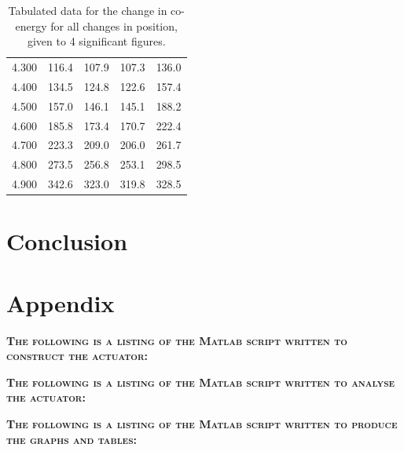 \documentclass[a4paper]{IEEEtran}
\begin{document}
\begin{table}[]
\begin{tabular}{c|cccc}
            4.300 & 116.4 & 107.9 & 107.3 & 136.0 \\
            4.400 & 134.5 & 124.8 & 122.6 & 157.4 \\
            4.500 & 157.0 & 146.1 & 145.1 & 188.2 \\
            4.600 & 185.8 & 173.4 & 170.7 & 222.4 \\
            4.700 & 223.3 & 209.0 & 206.0 & 261.7 \\
            4.800 & 273.5 & 256.8 & 253.1 & 298.5 \\
            4.900 & 342.6 & 323.0 & 319.8 & 328.5
        \end{tabular}
        \caption{Tabulated data for the change in co-energy for all changes in position, given to 4 significant figures.}
        \label{coenergy}
    \end{table}


\section{Conclusion}


\pagebreak
\onecolumn
\section{Appendix}
\textsc{\textbf{The following is a listing of the Matlab script written to construct the actuator:}}


\pagebreak
\textsc{\textbf{The following is a listing of the Matlab script written to analyse the actuator:}}

 
\pagebreak
\textsc{\textbf{The following is a listing of the Matlab script written to produce the graphs and tables:}}

\end{document}
